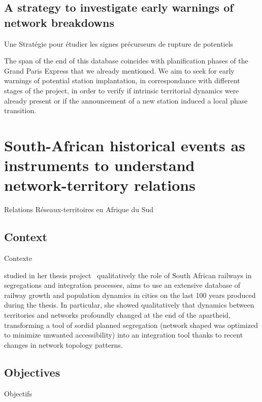 \subsection{A strategy to investigate early warnings of network breakdowns}{Une Stratégie pour étudier les signes précurseurs de rupture de potentiels}


The span of the end of this database coincides with planification phases of the Grand Paris Express that we already mentioned. 
 We aim to seek for early warnings of potential station implantation, in correspondance with different stages of the project, in order to verify if intrinsic territorial dynamics were already present or if the announcement of a new station induced a local phase transition.






\newpage

\section[South-African historical events as instruments]{South-African historical events as instruments to understand network-territory relations}{Relations Réseaux-territoires en Afrique du Sud}

\subsection{Context}{Contexte}


 studied in her thesis project~\cite{baffi:tel-01389347} qualitatively the role of South African railways in segregations and integration processes, aims to use an extensive database of railway growth and population dynamics in cities on the last 100 years produced during the thesis. In particular, she showed qualitatively that dynamics between territories and networks profoundly changed at the end of the apartheid, transforming a tool of sordid  planned segregation (network shaped was optimized to minimize unwanted accessibility) into an integration tool thanks to recent changes in network topology patterns.

\subsection{Objectives}{Objectifs}

